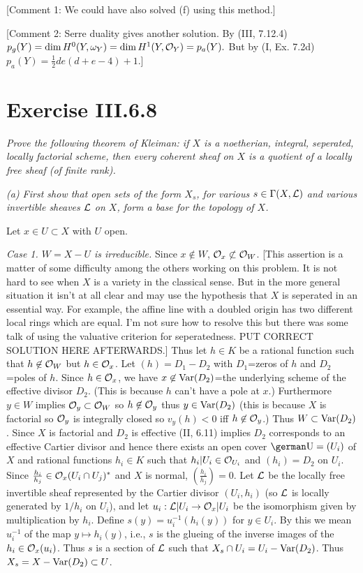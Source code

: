 \documentclass[12pt]{article}
\begin{document}
[Comment 1: We could have also solved (f) using this method.]

[Comment 2: Serre duality gives another solution. By (III, 7.12.4)
$p_g(Y)=\dim H^0(Y,\omega_Y)=\dim H^1(Y,\mathcal{O}_Y)=p_a(Y).$
But by (I, Ex. 7.2d) $p_a(Y)=\frac{1}{2}de(d+e-4)+1$.]


\section{Exercise III.6.8}
{\em Prove the following theorem of
Kleiman: if $X$ is a noetherian, integral, seperated,
locally factorial scheme, then every coherent sheaf on 
$X$ is a quotient of a locally free sheaf (of finite rank).} 

{\em (a) First show that open sets of the form $X_s$, for
various $s\in\Gamma(X,\mathcal{L})$ and various invertible sheaves
$\mathcal{L}$ on $X$, form a base for the topology of $X$.} 

Let $x\in U\subset X$ with $U$ open. 

{\em Case 1. $W=X-U$ is irreducible.}
Since $x\not\in W$, $\mathcal{O}_x\not\subset \mathcal{O}_W$. 
[This assertion is a matter of some difficulty among the
others working on this problem. It is not hard to see when 
$X$ is a variety in the classical sense. But in the more general
situation it isn't at all clear and may use the hypothesis that 
$X$ is seperated in an essential way. For example, the affine line
with a doubled origin has two different local rings which are equal.
I'm not sure how to resolve this but there was some talk of using
the valuative criterion for seperatedness. PUT CORRECT SOLUTION HERE 
AFTERWARDS.]
Thus let $h\in K$ be a rational
function such that $h\not\in\mathcal{O}_W$ but $h\in\mathcal{O}_x$. Let $(h)=D_1-D_2$
with $D_1$=zeros of $h$ and $D_2$=poles of $h$. Since $h\in\mathcal{O}_x$, we
have $x\not\in\operatorname{Var}(D_2)$=the underlying scheme of the effective
divisor $D_2$. (This is because $h$ can't have a pole at $x$.) Furthermore
$y\in W$ implies $\mathcal{O}_y\subset\mathcal{O}_W$ so $h\not\in\mathcal{O}_y$ thus $y\in\operatorname{Var}(D_2)$ 
(this is because $X$
is factorial so $\mathcal{O}_y$ is integrally closed so $v_y(h)<0$ iff
$h\not\in\mathcal{O}_y$.) Thus $W\subset\operatorname{Var}(D_2)$. Since $X$ is factorial and
$D_2$ is effective (II, 6.11) implies
$D_2$ corresponds to an effective Cartier divisor and hence there exists
an open cover $\sU=(U_i)$ of $X$ and rational functions $h_i\in K$
such that $h_i|U_i\in\mathcal{O}_{U_i}$ and $(h_i)=D_2$ on $U_i$. Since
$\frac{h_i}{h_j}\in\mathcal{O}_x(U_i\cap U_j)^{*}$ and $X$ is normal,
$(\frac{h_i}{h_j})=0$. Let $\mathcal{L}$ be the locally free invertible sheaf
represented by the Cartier divisor $(U_i,h_i)$ (so $\mathcal{L}$ is locally
generated by $1/h_i$ on $U_i$), and let $u_i:\mathcal{L}|U_i\rightarrow\mathcal{O}_x|U_i$
be the isomorphism given by multiplication by $h_i$. Define
$s(y)=u_i^{-1}(h_i(y))$ for $y\in U_i$. By this we mean $u_i^{-1}$ of
the map $y\mapsto h_i(y)$, i.e., $s$ is the glueing of the inverse images
of the $h_i\in\mathcal{O}_x(u_i)$. Thus $s$ is a section of $\mathcal{L}$ such that
$X_s\cap U_i=U_i-\operatorname{Var}(D_2)$. Thus
$X_s=X-\operatorname{Var}(D_2)\subset U$. 
\end{document}
